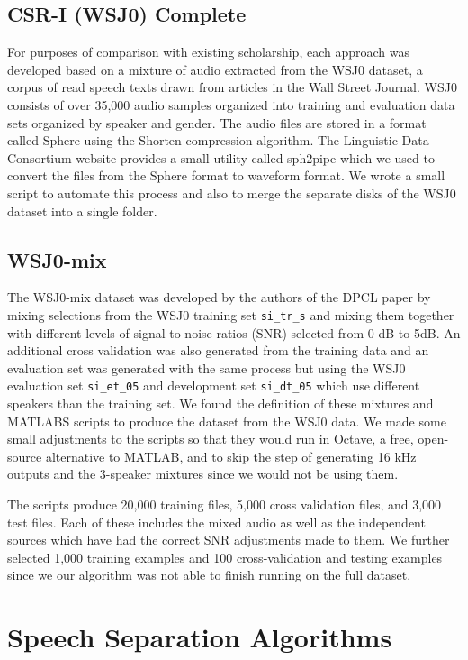 \documentclass[journal, a4paper]{IEEEtran}
\begin{document}
\subsection{CSR-I (WSJ0) Complete}
For purposes of comparison with existing scholarship, each approach was developed based on a mixture of audio extracted from the WSJ0 dataset, a corpus of read speech texts drawn from articles in the Wall Street Journal. WSJ0 \cite{garofolo:wsj0} consists of over 35,000 audio samples organized into training and evaluation data sets organized by speaker and gender. The audio files are stored in a format called Sphere using the Shorten compression algorithm. The Linguistic Data Consortium website provides a small utility called sph2pipe \cite{ldc:sph2pipe} which we used to convert the files from the Sphere format to waveform format. We wrote a small script to automate this process and also to merge the separate disks of the WSJ0 dataset into a single folder.

\subsection{WSJ0-mix}
The WSJ0-mix dataset was developed by the authors of the DPCL \cite{DBLP:journals/corr/HersheyCRW15} paper by mixing selections from the WSJ0 training set \texttt{si\_tr\_s} and mixing them together with different levels of signal-to-noise ratios (SNR) selected from 0 dB to 5dB. An additional cross validation was also generated from the training data and an evaluation set was generated with the same process but using the WSJ0 evaluation set \texttt{si\_et\_05} and development set \texttt{si\_dt\_05} which use different speakers than the training set. We found the definition of these mixtures and MATLABS scripts \cite{WSJmix} to produce the dataset from the WSJ0 data. We made some small adjustments to the scripts so that they would run in Octave, a free, open-source alternative to MATLAB, and to skip the step of generating 16 kHz outputs and the 3-speaker mixtures since we would not be using them.

The scripts produce 20,000 training files, 5,000 cross validation files, and 3,000 test files. Each of these includes the mixed audio as well as the independent sources which have had the correct SNR adjustments made to them. We further selected 1,000 training examples and 100 cross-validation and testing examples since we our algorithm was not able to finish running on the full dataset.


\section{Speech Separation Algorithms}
\end{document}
